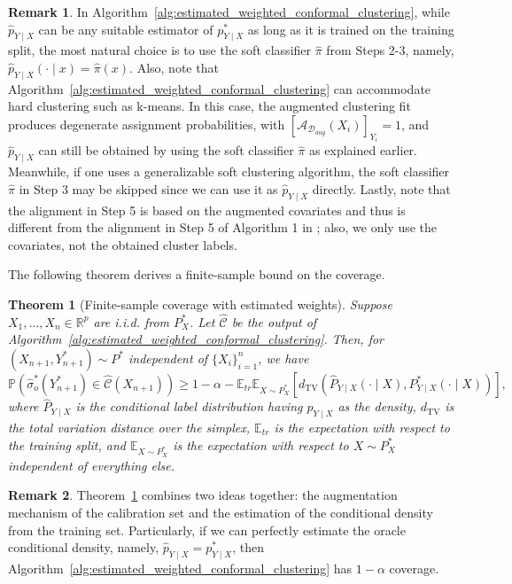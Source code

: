 \documentclass[11pt,letterpaper]{article}
\newtheorem{theorem}{Theorem} %
\theoremstyle{definition}
\newtheorem{remark}{Remark}
\newcommand{\cC}{\mathcal{C}}
\newcommand{\cD}{\mathcal{D}}
\newcommand{\R}{\mathbb{R}}
\newcommand{\E}{\mathbb{E}} %
\renewcommand{\P}{\mathbb{P}}
\begin{document}
\begin{remark}
    In Algorithm~\ref{alg:estimated_weighted_conformal_clustering}, while $\hat{p}_{Y \mid X}$ can be any suitable estimator of $p_{Y \mid X}^\ast$ as long as it is trained on the training split, the most natural choice is to use the soft classifier $\hat{\pi}$ from Steps 2-3, namely, $\hat{p}_{Y \mid X}(\cdot \mid x) = \hat{\pi}(x)$. Also, note that Algorithm~\ref{alg:estimated_weighted_conformal_clustering} can accommodate hard clustering such as k-means. In this case, the augmented clustering fit produces degenerate assignment probabilities, with \([\mathcal A_{\cD_{aug}}(X_i)]_{Y_i}=1\), and $\hat{p}_{Y \mid X}$ can still be obtained by using the soft classifier $\hat{\pi}$ as explained earlier. Meanwhile, if one uses a generalizable soft clustering algorithm, the soft classifier $\hat{\pi}$ in Step 3 may be skipped since we can use it as $\hat{p}_{Y \mid X}$ directly. Lastly, note that the alignment in Step 5 is based on the augmented covariates and thus is different from the alignment in Step 5 of Algorithm 1 in \cite{hur2026inference}; also, we only use the covariates, not the obtained cluster labels.
\end{remark}

The following theorem derives a finite-sample bound on the coverage.

\begin{theorem}[Finite-sample coverage with estimated weights]
    \label{thm:coverage_estimated_weights}
    Suppose $X_1,\ldots,X_n \in \R^p$ are i.i.d. from $P^\ast_X$. Let \(\hat{\cC}\) be the output of Algorithm~\ref{alg:estimated_weighted_conformal_clustering}. Then, for $(X_{n+1},Y_{n+1}^\ast)\sim P^\ast$ independent of $\{X_i\}_{i=1}^n$, we have
    \[
        \P\left(\hat{\sigma}_o^\ast(Y_{n+1}^\ast)\in \hat{\cC}(X_{n+1})\right)
        \ge 1-\alpha - \E_{tr} \E_{X \sim P^\ast_X}\left[d_{\mathrm{TV}}\!\left(\widehat P_{Y\mid X}(\cdot\mid X), P_{Y\mid X}^\ast(\cdot\mid X)\right)\right],
    \]
    where $\widehat{P}_{Y \mid X}$ is the conditional label distribution having $\hat{p}_{Y \mid X}$ as the density, $d_{\mathrm{TV}}$ is the total variation distance over the simplex, $\E_{tr}$ is the expectation with respect to the training split, and $\E_{X \sim P_X^\ast}$ is the expectation with respect to $X \sim P_X^\ast$ independent of everything else.
\end{theorem}

\begin{remark}
    Theorem~\ref{thm:coverage_estimated_weights} combines two ideas together: the augmentation mechanism of the calibration set and the estimation of the conditional density from the training set. Particularly, if we can perfectly estimate the oracle conditional density, namely, $\hat{p}_{Y \mid X} = p^\ast_{Y \mid X}$, then Algorithm~\ref{alg:estimated_weighted_conformal_clustering} has $1 - \alpha$ coverage.
\end{remark}
\end{document}
